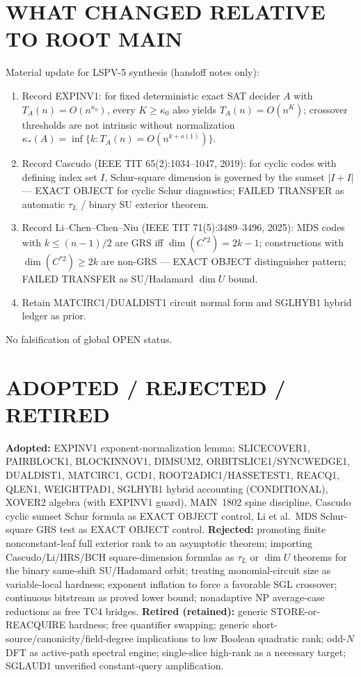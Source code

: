 \documentclass[11pt]{article}
\begin{document}
\section*{WHAT CHANGED RELATIVE TO ROOT MAIN}
Material update for LSPV-5 synthesis (handoff notes only):
\begin{enumerate}
\item Record EXPINV1: for fixed deterministic exact SAT decider $A$ with
$T_A(n)=O(n^{\kappa_0})$, every $K\ge\kappa_0$ also yields $T_A(n)=O(n^K)$;
crossover thresholds are not intrinsic without normalization
$\kappa_*(A)=\inf\{k:T_A(n)=O(n^{k+o(1)})\}$.
\item Record Cascudo (IEEE TIT 65(2):1034--1047, 2019): for cyclic codes with defining
index set $I$, Schur-square dimension is governed by the sumset $|I+I|$ ---
EXACT OBJECT for cyclic Schur diagnostics; FAILED TRANSFER as automatic
$\tau_L$ / binary SU exterior theorem.
\item Record Li--Chen--Chen--Niu (IEEE TIT 71(5):3489--3496, 2025): MDS codes with
$k\le(n-1)/2$ are GRS iff $\dim(C^{*2})=2k-1$; constructions with
$\dim(C^{*2})\ge 2k$ are non-GRS --- EXACT OBJECT distinguisher pattern;
FAILED TRANSFER as SU/Hadamard $\dim U$ bound.
\item Retain MATCIRC1/DUALDIST1 circuit normal form and SGLHYB1 hybrid ledger as prior.
\end{enumerate}
No falsification of global OPEN status.

\section*{ADOPTED / REJECTED / RETIRED}
\textbf{Adopted:} EXPINV1 exponent-normalization lemma; SLICECOVER1, PAIRBLOCK1, BLOCKINNOV1,
DIMSUM2, ORBITSLICE1/SYNCWEDGE1, DUALDIST1, MATCIRC1, GCD1, ROOT2ADIC1/HASSETEST1, REACQ1,
QLEN1, WEIGHTPAD1, SGLHYB1 hybrid accounting (CONDITIONAL), XOVER2 algebra (with EXPINV1 guard),
MAIN~1802 spine discipline, Cascudo cyclic sumset Schur formula as EXACT OBJECT control,
Li et al.\ MDS Schur-square GRS test as EXACT OBJECT control.
\textbf{Rejected:} promoting finite nonconstant-leaf full exterior rank to an asymptotic theorem;
importing Cascudo/Li/HRS/BCH square-dimension formulas as $\tau_L$ or $\dim U$ theorems for the
binary same-shift SU/Hadamard orbit; treating monomial-circuit size as variable-local hardness;
exponent inflation to force a favorable SGL crossover; continuous bitstream as proved lower bound;
nonadaptive NP average-case reductions as free TC4 bridges.
\textbf{Retired (retained):} generic STORE-or-REACQUIRE hardness; free quantifier swapping;
generic short-source/canonicity/field-degree implications to low Boolean quadratic rank;
odd-$N$ DFT as active-path spectral engine; single-slice high-rank as a necessary target;
SGLAUD1 unverified constant-query amplification.
\end{document}
